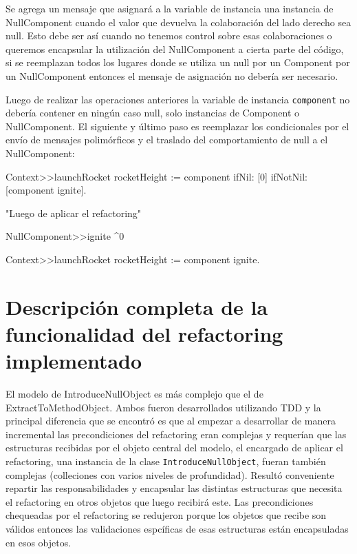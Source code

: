 Se agrega un mensaje que asignará a la variable de instancia una instancia de NullComponent cuando
el valor que devuelva la colaboración del lado derecho sea null. Esto debe ser así cuando no tenemos
control sobre esas colaboraciones o queremos encapsular la utilización del NullComponent a cierta parte
del código, si se reemplazan todos los lugares donde se utiliza un null por un Component por un NullComponent
entonces el mensaje de asignación no debería ser necesario.

Luego de realizar las operaciones anteriores la variable de instancia \lstinline{component} no
debería contener en ningún caso null, solo instancias de Component o NullComponent. El siguiente y
último paso es reemplazar los condicionales por el envío de mensajes polimórficos y el traslado
del comportamiento de null a el NullComponent:

\begin{code}
Context>>launchRocket
    rocketHeight := component ifNil: [0] ifNotNil: [component ignite].

"Luego de aplicar el refactoring"

NullComponent>>ignite
    ^0

Context>>launchRocket
    rocketHeight := component ignite.
\end{code}







\section{Descripción completa de la funcionalidad del refactoring implementado}

El modelo de IntroduceNullObject es más complejo que el de ExtractToMethodObject. Ambos fueron
desarrollados
utilizando TDD y la principal diferencia que se encontró es que al empezar a desarrollar de manera
incremental las precondiciones del refactoring eran complejas y requerían que las estructuras
recibidas por el objeto central del modelo, el encargado de aplicar el refactoring, una instancia de
la clase \lstinline{IntroduceNullObject}, fueran también complejas (colleciones con varios niveles
de profundidad). Resultó conveniente repartir las responsabilidades y encapsular las distintas
estructuras que necesita el refactoring en otros objetos que luego recibirá este. Las precondiciones
chequeadas por el refactoring se redujeron porque los objetos que recibe son válidos entonces las
validaciones espcíficas de esas estructuras están encapsuladas en esos objetos.

